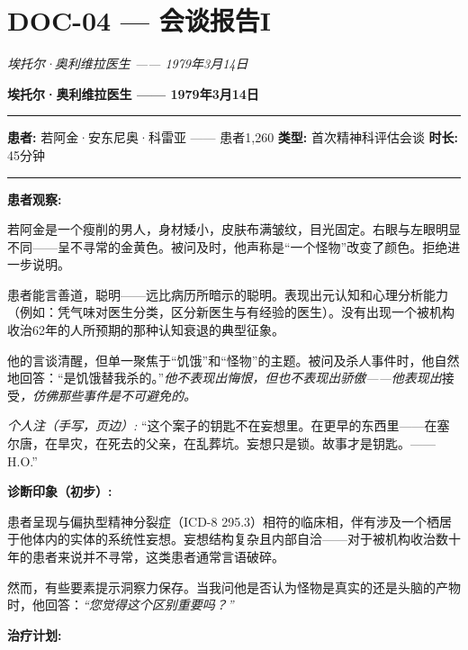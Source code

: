 \section*{\textbf{DOC-04} --- 会谈报告I}

\noindent \textit{埃托尔·奥利维拉医生 —— 1979年3月14日}

\noindent \textbf{埃托尔·奥利维拉医生 —— 1979年3月14日}

\vspace{0.5em}\noindent\rule{\textwidth}{0.5pt}\vspace{0.5em}

\noindent \textbf{患者:} 若阿金·安东尼奥·科雷亚 —— 患者1,260
\textbf{类型:} 首次精神科评估会谈
\textbf{时长:} 45分钟

\vspace{0.5em}\noindent\rule{\textwidth}{0.5pt}\vspace{0.5em}

\noindent \textbf{患者观察:}

\noindent 若阿金是一个瘦削的男人，身材矮小，皮肤布满皱纹，目光固定。右眼与左眼明显不同——呈不寻常的金黄色。被问及时，他声称是“一个怪物”改变了颜色。拒绝进一步说明。

\noindent 患者能言善道，聪明——远比病历所暗示的聪明。表现出元认知和心理分析能力（例如：凭气味对医生分类，区分新医生与有经验的医生）。没有出现一个被机构收治62年的人所预期的那种认知衰退的典型征象。

\noindent 他的言谈清醒，但单一聚焦于“饥饿”和“怪物”的主题。被问及杀人事件时，他自然地回答：“是饥饿替我杀的。”\textit{他不表现出悔恨，但也不表现出骄傲——他表现出}接受\textit{，仿佛那些事件是不可避免的。}

\noindent \textit{个人注（手写，页边）:} “这个案子的钥匙不在妄想里。在更早的东西里——在塞尔唐，在旱灾，在死去的父亲，在乱葬坑。妄想只是锁。故事才是钥匙。—— H.O.”

\noindent \textbf{诊断印象（初步）:}

\noindent 患者呈现与偏执型精神分裂症（ICD-8 295.3）相符的临床相，伴有涉及一个栖居于他体内的实体的系统性妄想。妄想结构复杂且内部自洽——对于被机构收治数十年的患者来说并不寻常，这类患者通常言语破碎。

\noindent 然而，有些要素提示洞察力保存。当我问他是否认为怪物是真实的还是头脑的产物时，他回答：\textit{“您觉得这个区别重要吗？”}

\noindent \textbf{治疗计划:}


